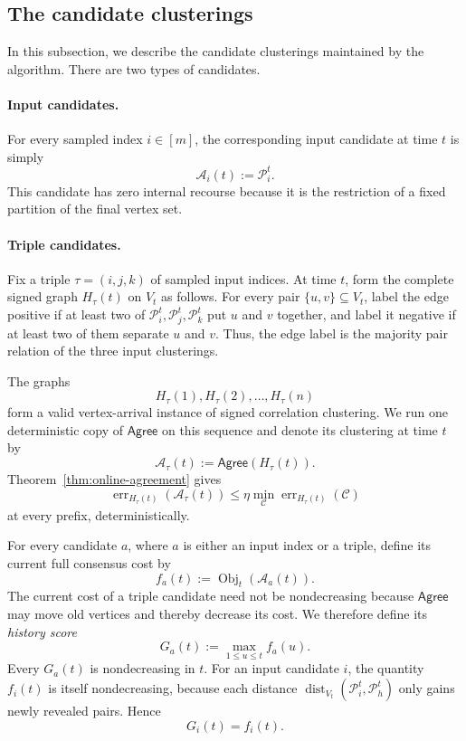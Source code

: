 \documentclass[11pt]{article}
\theoremstyle{definition}
\theoremstyle{remark}
\newcommand{\A}{\mathcal A}
\newcommand{\C}{\mathcal C}
\newcommand{\Pp}{\mathcal P}
\newcommand{\Obj}{\operatorname{Obj}}
\newcommand{\err}{\operatorname{err}}
\newcommand{\dist}{\operatorname{dist}}
\newcommand{\Agree}{\mathsf{Agree}}
\newcommand{\1}{\mathbf 1}
\begin{document}
\subsection{The candidate clusterings}

In this subsection, we describe the candidate clusterings maintained by the
algorithm.  There are two types of candidates.

\paragraph{Input candidates.}
For every sampled index $i\in[m]$, the corresponding input candidate at time
$t$ is simply
\[
  \A_i(t):=\Pp_i^t.
\]
This candidate has zero internal recourse because it is the restriction of a
fixed partition of the final vertex set.

\paragraph{Triple candidates.}
Fix a triple $\tau=(i,j,k)$ of sampled input indices.  At time $t$, form the
complete signed graph $H_\tau(t)$ on $V_t$ as follows.  For every pair
$\{u,v\}\subseteq V_t$, label the edge positive if at least two of
$\Pp_i^t,\Pp_j^t,\Pp_k^t$ put $u$ and $v$ together, and label it negative if
at least two of them separate $u$ and $v$.  Thus, the edge label is the
majority pair relation of the three input clusterings.

The graphs
\[
  H_\tau(1),H_\tau(2),\ldots,H_\tau(n)
\]
form a valid vertex-arrival instance of signed correlation clustering.  We
run one deterministic copy of $\Agree$ on this sequence and denote its
clustering at time $t$ by
\[
  \A_\tau(t):=\Agree(H_\tau(t)).
\]
Theorem~\ref{thm:online-agreement} gives
\begin{equation}\label{eq:triple-cc-guarantee}
  \err_{H_\tau(t)}(\A_\tau(t))
  \le
  \eta\min_{\C}\err_{H_\tau(t)}(\C)
\end{equation}
at every prefix, deterministically.

For every candidate $a$, where $a$ is either an input index or a triple,
define its current full consensus cost by
\begin{equation}\label{eq:current-candidate-score}
  f_a(t):=\Obj_t(\A_a(t)).
\end{equation}
The current cost of a triple candidate need not be nondecreasing because
$\Agree$ may move old vertices and thereby decrease its cost.  We therefore
define its \emph{history score}
\begin{equation}\label{eq:history-score}
  G_a(t):=\max_{1\le u\le t}f_a(u).
\end{equation}
Every $G_a(t)$ is nondecreasing in $t$.  For an input candidate $i$, the
quantity $f_i(t)$ is itself nondecreasing, because each distance
$\dist_{V_t}(\Pp_i^t,\Pp_h^t)$ only gains newly revealed pairs.  Hence
\begin{equation}\label{eq:input-history-current}
  G_i(t)=f_i(t).
\end{equation}
\end{document}

